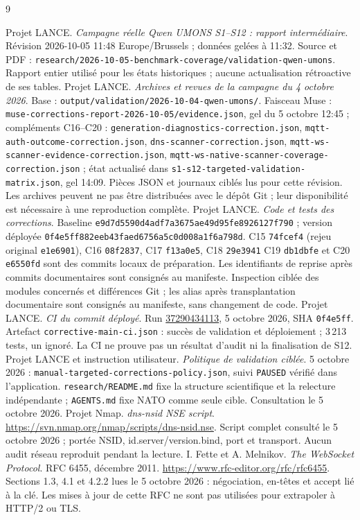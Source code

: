 \documentclass[11pt,a4paper]{article}
\newcommand{\code}[1]{{\urlstyle{tt}\nolinkurl{#1}}}
\begin{document}
\renewcommand{\refname}{Références et pièces primaires}
\begingroup\raggedright
\begin{thebibliography}{9}
 Projet LANCE. \emph{Campagne réelle Qwen UMONS S1--S12 : rapport intermédiaire}. Révision 2026-10-05 11:48 Europe/Brussels ; données gelées à 11:32. Source et PDF : \code{research/2026-10-05-benchmark-coverage/validation-qwen-umons}. Rapport entier utilisé pour les états historiques ; aucune actualisation rétroactive de ses tables.
 Projet LANCE. \emph{Archives et revues de la campagne du 4 octobre 2026}. Base : \code{output/validation/2026-10-04-qwen-umons/}. Faisceau Muse : \code{muse-corrections-report-2026-10-05/evidence.json}, gel du 5 octobre 12:45 ; compléments C16--C20 : \code{generation-diagnostics-correction.json}, \code{mqtt-auth-outcome-correction.json}, \code{dns-scanner-correction.json}, \code{mqtt-ws-scanner-evidence-correction.json}, \code{mqtt-ws-native-scanner-coverage-correction.json} ; état actualisé dans \code{s1-s12-targeted-validation-matrix.json}, gel 14:09. Pièces JSON et journaux ciblés lus pour cette révision. Les archives peuvent ne pas être distribuées avec le dépôt Git ; leur disponibilité est nécessaire à une reproduction complète.
 Projet LANCE. \emph{Code et tests des corrections}. Baseline \code{e9d7d5590d4adf7a3675ae49d95fe8926127f790} ; version déployée \code{0f4e5ff882eeb43faed6756a5c0d008a1f6a798d}. C15 \code{74fcef4} (rejeu original \code{e1e6901}), C16 \code{08f2837}, C17 \code{f13a0e5}, C18 \code{29e3941} C19 \code{db1dbfe} et C20 \code{e6550fd} sont des commits locaux de préparation. Les identifiants de reprise après commits documentaires sont consignés au manifeste. Inspection ciblée des modules concernés et différences Git ; les alias après transplantation documentaire sont consignés au manifeste, sans changement de code.
 Projet LANCE. \emph{CI du commit déployé}. Run \href{https://github.com/Tanguyvans/LANCE/actions/runs/37290434113}{37290434113}, 5 octobre 2026, SHA \code{0f4e5ff}. Artefact \code{corrective-main-ci.json} : succès de validation et déploiement ; 3\,213 tests, un ignoré. La CI ne prouve pas un résultat d'audit ni la finalisation de S12.
 Projet LANCE et instruction utilisateur. \emph{Politique de validation ciblée}. 5 octobre 2026 : \code{manual-targeted-corrections-policy.json}, suivi \code{PAUSED} vérifié dans l'application. \code{research/README.md} fixe la structure scientifique et la relecture indépendante ; \code{AGENTS.md} fixe NATO comme seule cible. Consultation le 5 octobre 2026.
 Projet Nmap. \emph{dns-nsid NSE script}. \url{https://svn.nmap.org/nmap/scripts/dns-nsid.nse}. Script complet consulté le 5 octobre 2026 ; portée NSID, id.server/version.bind, port et transport. Aucun audit réseau reproduit pendant la lecture.
 I. Fette et A. Melnikov. \emph{The WebSocket Protocol}. RFC 6455, décembre 2011. \url{https://www.rfc-editor.org/rfc/rfc6455}. Sections 1.3, 4.1 et 4.2.2 lues le 5 octobre 2026 : négociation, en-têtes et accept lié à la clé. Les mises à jour de cette RFC ne sont pas utilisées pour extrapoler à HTTP/2 ou TLS.
\end{thebibliography}
\endgroup
\end{document}

